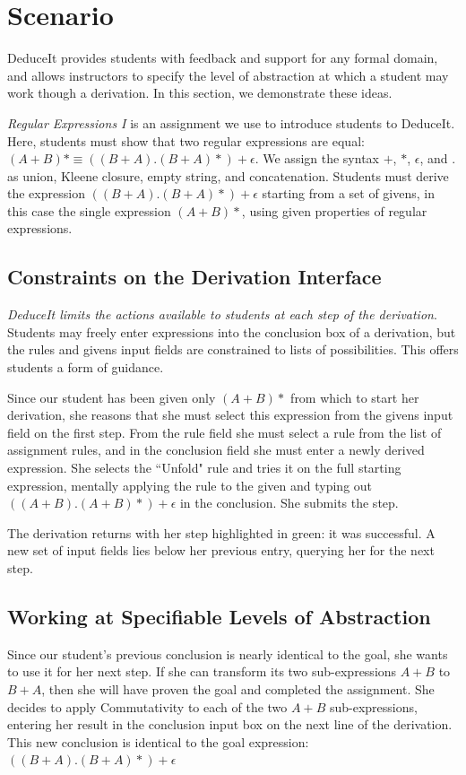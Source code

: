 \documentclass{sigchi}
\begin{document}
\section{Scenario}
DeduceIt provides students with feedback and support for any formal domain, and allows instructors to specify the level of abstraction at which a student may work though a derivation. In this section, we demonstrate these ideas. 

\textit{Regular Expressions I} is an assignment we use to introduce students to DeduceIt. Here, students must show that two regular expressions are equal: $(A+B)* \equiv ((B+A).(B+A)*)+\epsilon$. We assign the syntax $+$, $*$, $\epsilon$, and $.$ as union, Kleene closure, empty string, and concatenation. Students must derive the expression $((B+A).(B+A)*)+\epsilon$ starting from a set of givens, in this case the single expression $(A+B)*$, using given properties of regular expressions.

\subsection{Constraints on the Derivation Interface}

\textit{DeduceIt limits the actions available to students at each step of the derivation}. Students may freely enter expressions into the conclusion box of a derivation, but the rules and givens input fields are constrained to lists of possibilities. This offers students a form of guidance.

Since our student has been given only $(A+B)*$ from which to start her derivation, she reasons that she must select this expression from the givens input field on the first step. From the rule field she must select a rule from the list of assignment rules, and in the conclusion field she must enter a newly derived expression. She selects the ``Unfold" rule and tries it on the full starting expression, mentally applying the rule to the given and typing out $((A + B).(A + B)*)+\epsilon$ in the conclusion. She submits the step. 

The derivation returns with her step highlighted in green: it was successful. A new set of input fields lies below her previous entry, querying her for the next step.

\subsection{Working at Specifiable Levels of Abstraction}
Since our student's previous conclusion is nearly identical to the goal, she wants to use it for her next step. If she can transform its two sub-expressions $A+B$ to $B+A$, then she will have proven the goal and completed the assignment. She decides to apply Commutativity to each of the two $A+B$ sub-expressions, entering her result in the conclusion input box on the next line of the derivation. This new conclusion is identical to the goal expression: $((B+A).(B+A)*)+\epsilon$
\end{document}
